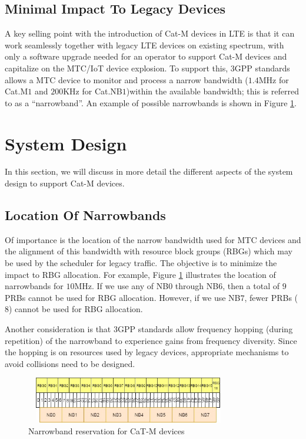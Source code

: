 \documentclass[conference,compsoc]{IEEEtran}
\begin{document}
\subsection{Minimal Impact To Legacy Devices}
A key selling point with the introduction of Cat-M devices in LTE is that it can work seamlessly together with legacy LTE devices on existing spectrum, with only a software upgrade needed for an operator to support Cat-M devices and capitalize on the MTC/IoT device explosion. To support this, 3GPP standards allows a MTC device to monitor and process a narrow bandwidth ($1.4$MHz for Cat.M$1$ and $200$KHz for Cat.NB$1$)within the available bandwidth; this is referred to as a “narrowband”. An example of possible narrowbands is shown in Figure \ref{fig_narrowband}. 

\section{System Design}
In this section, we will discuss in more detail the different aspects of the system design to support Cat-M devices.

\subsection{Location Of Narrowbands}
Of importance is the location of the narrow bandwidth used for MTC devices and the alignment of this bandwidth with resource block groups (RBGs) which may be used by the scheduler for legacy traffic. The objective is to minimize the impact to RBG allocation.  For example, Figure \ref{fig_narrowband} illustrates the location of narrowbands for $10$MHz. If we use any of NB$0$ through NB$6$, then a total of $9$ PRBs cannot be used for RBG allocation. However, if we use NB$7$, fewer PRBs ($8$) cannot be used for RBG allocation.

Another consideration is that $3$GPP standards allow frequency hopping (during repetition) of the narrowband  to experience gains from frequency diversity. Since the hopping is on resources used by legacy devices, appropriate mechanisms to avoid collisions need to be designed.

\begin{figure}[htbp]
\centerline{\includegraphics[height=20mm,width=90mm]{narrowband.png}}
\caption{Narrowband reservation for CaT-M devices}
\label{fig_narrowband}
\end{figure}
\end{document}
